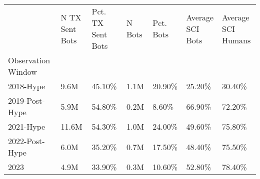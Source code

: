 \begin{tabular}{lllllll}
\toprule
{} & \thead{N TX Sent \\Bots} & \thead{Pct. TX Sent \\Bots} & N Bots & Pct. Bots & \thead{Average \\SCI Bots} & \thead{Average \\SCI Humans} \\
Observation Window &                                        &                                           &        &           &                                          &                                            \\
\midrule
2018-Hype          &                                   9.6M &                                    45.10\% &   1.1M &    20.90\% &                                   25.20\% &                                     30.40\% \\
2019-Post-Hype     &                                   5.9M &                                    54.80\% &   0.2M &     8.60\% &                                   66.90\% &                                     72.20\% \\
2021-Hype          &                                  11.6M &                                    54.30\% &   1.0M &    24.00\% &                                   49.60\% &                                     75.80\% \\
2022-Post-Hype     &                                   6.0M &                                    35.20\% &   0.7M &    17.50\% &                                   48.40\% &                                     75.50\% \\
2023               &                                   4.9M &                                    33.90\% &   0.3M &    10.60\% &                                   52.80\% &                                     78.40\% \\
\bottomrule
\end{tabular}
